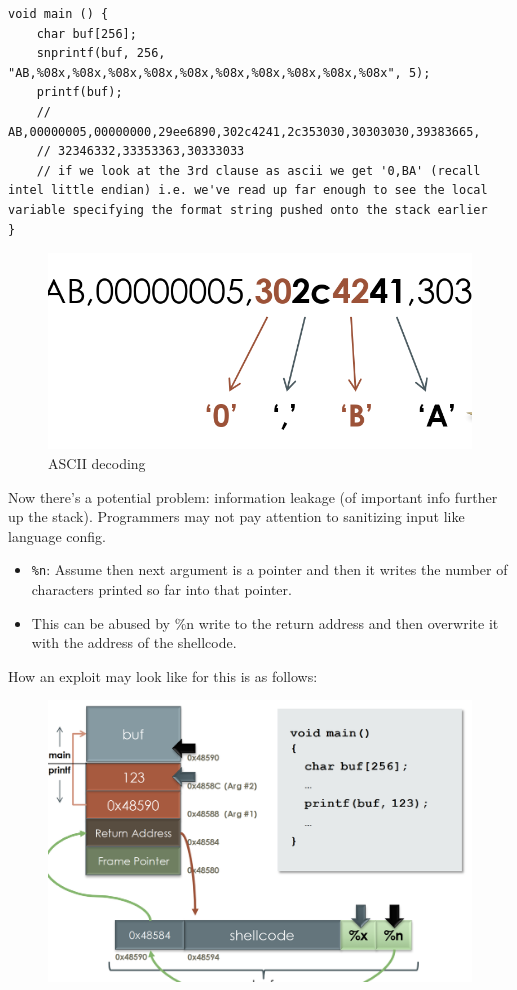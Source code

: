 \documentclass[../notes.tex]{subfiles}
\begin{document}
\begin{listing}[H]
\begin{verbatim}
void main () {
    char buf[256];
    snprintf(buf, 256, "AB,%08x,%08x,%08x,%08x,%08x,%08x,%08x,%08x,%08x,%08x", 5);
    printf(buf);
    // AB,00000005,00000000,29ee6890,302c4241,2c353030,30303030,39383665,
    // 32346332,33353363,30333033
    // if we look at the 3rd clause as ascii we get '0,BA' (recall intel little endian) i.e. we've read up far enough to see the local variable specifying the format string pushed onto the stack earlier
}
\end{verbatim}
\end{listing}
\begin{figure}[H]
    \centering
    \includegraphics[width=0.8\linewidth]{img/image_2023-01-16-19-06-48.png}
    \caption{ASCII decoding}
\end{figure}

Now there's a potential problem: information leakage (of important info further up the stack).
Programmers may not pay attention to sanitizing input like language config.


\begin{itemize}
    \item \texttt{\%n}: Assume then next argument is a pointer and then it writes the number of characters printed so far into that pointer. 
    \item This can be abused by \%n  write to the return address and then overwrite it with the address of the shellcode.
\end{itemize}


How an exploit may look like for this is as follows:

\begin{figure}[H]
    \centering
    \includegraphics[width=0.8\linewidth]{img/image_2023-01-16-19-39-16.png}
\end{figure}
\end{document}
